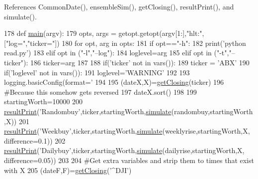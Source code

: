 References Common\+Date(), ensemble\+Sim(), get\+Closing(), result\+Print(), and simulate().


\begin{DoxyCode}
178 \textcolor{keyword}{def }\hyperlink{namespacestocks_aa4d6e539aeea3ab00b8bf598b1025e58}{main}(argv):
179     opts, args = getopt.getopt(argv[1:],\textcolor{stringliteral}{"hlt:"},[\textcolor{stringliteral}{"log="},\textcolor{stringliteral}{"ticker="}])
180     \textcolor{keywordflow}{for} opt, arg \textcolor{keywordflow}{in} opts:
181         \textcolor{keywordflow}{if} opt==\textcolor{stringliteral}{"-h"}:
182             print(\textcolor{stringliteral}{'python read.py'})
183         \textcolor{keywordflow}{elif} opt \textcolor{keywordflow}{in} (\textcolor{stringliteral}{"-l"},\textcolor{stringliteral}{"--log"}):
184             loglevel=arg
185         \textcolor{keywordflow}{elif} opt \textcolor{keywordflow}{in} (\textcolor{stringliteral}{"-t"},\textcolor{stringliteral}{"--ticker"}):
186             ticker=arg
187 
188     if(\textcolor{stringliteral}{'ticker'} \textcolor{keywordflow}{not} \textcolor{keywordflow}{in} vars()):
189         ticker = \textcolor{stringliteral}{'ABX'}
190     if(\textcolor{stringliteral}{'loglevel'} \textcolor{keywordflow}{not} \textcolor{keywordflow}{in} vars()):
191         loglevel=\textcolor{stringliteral}{'WARNING'}
192 
193     logging.basicConfig(format=\textcolor{stringliteral}{'%
194 
195     (dateX,X)=\hyperlink{namespacestocks_a44235135cad9d919663b15452cf3e613}{getClosing}(ticker)
196     \textcolor{comment}{#Because this somehow gets reversed}
197     dateX.sort()
198 
199     startingWorth=10000
200     \hyperlink{namespacestocks_ac80b7d5d1cdc027b7a0e2e19093baf9b}{resultPrint}(\textcolor{stringliteral}{'Randombuy'},ticker,startingWorth,\hyperlink{namespacestocks_a6217dcad564ba6361c3cca44542ba220}{simulate}(randombuy,startingWorth,X))
201     \hyperlink{namespacestocks_ac80b7d5d1cdc027b7a0e2e19093baf9b}{resultPrint}(\textcolor{stringliteral}{'Weekbuy'},ticker,startingWorth,\hyperlink{namespacestocks_a6217dcad564ba6361c3cca44542ba220}{simulate}(weeklyrise,startingWorth,X,
      difference=0.1))
202     \hyperlink{namespacestocks_ac80b7d5d1cdc027b7a0e2e19093baf9b}{resultPrint}(\textcolor{stringliteral}{'Dailybuy'},ticker,startingWorth,\hyperlink{namespacestocks_a6217dcad564ba6361c3cca44542ba220}{simulate}(dailyrise,startingWorth,X,
      difference=0.05))
203 
204     \textcolor{comment}{#Get extra variables and strip them to times that exist with X}
205     (dateF,F)=\hyperlink{namespacestocks_a44235135cad9d919663b15452cf3e613}{getClosing}(\textcolor{stringliteral}{'^DJI'})
}
\end{DoxyCode}
